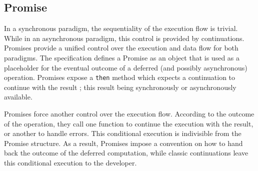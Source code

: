 \subsection{Promise} \label{section:definitions:promise}



In a synchronous paradigm, the sequentiality of the execution flow is trivial.
While in an asynchronous paradigm, this control is provided by continuations.
Promises provide a unified control over the execution and data flow for both paradigms.
The specification defines a Promise as an object that is used as a placeholder for the eventual outcome of a deferred (and possibly asynchronous) operation.
Promises expose a \texttt{then} method which expects a continuation to continue with the result ; this result being synchronously or asynchronously available.


Promises force another control over the execution flow.
According to the outcome of the operation, they call one function to continue the execution with the result, or another to handle errors.
This conditional execution is indivisible from the Promise structure.
As a result, Promises impose a convention on how to hand back the outcome of the deferred computation, while classic continuations leave this conditional execution to the developer.

